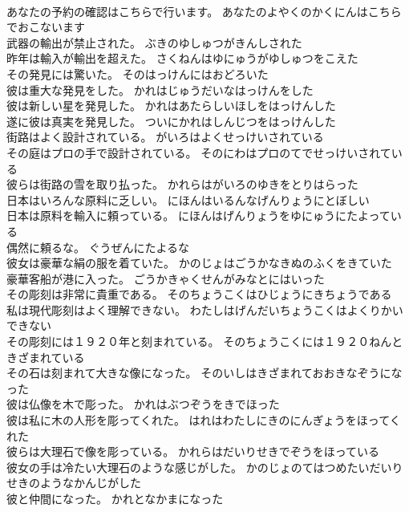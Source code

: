 \documentclass[8pt]{extreport}
\begin{document}
\begin{CJK}{UTF8}{min}
\\	あなたの予約の確認はこちらで行います。	あなたのよやくのかくにんはこちらでおこないます 
\\	武器の輸出が禁止された。	ぶきのゆしゅつがきんしされた 
\\	昨年は輸入が輸出を超えた。	さくねんはゆにゅうがゆしゅつをこえた 
\\	その発見には驚いた。	そのはっけんにはおどろいた 
\\	彼は重大な発見をした。	かれはじゅうだいなはっけんをした 
\\	彼は新しい星を発見した。	かれはあたらしいほしをはっけんした 
\\	遂に彼は真実を発見した。	ついにかれはしんじつをはっけんした 
\\	街路はよく設計されている。	がいろはよくせっけいされている 
\\	その庭はプロの手で設計されている。	そのにわはプロのてでせっけいされている 
\\	彼らは街路の雪を取り払った。	かれらはがいろのゆきをとりはらった 
\\	日本はいろんな原料に乏しい。	にほんはいるんなげんりょうにとぼしい 
\\	日本は原料を輸入に頼っている。	にほんはげんりょうをゆにゅうにたよっている 
\\	偶然に頼るな。	ぐうぜんにたよるな 
\\	彼女は豪華な絹の服を着ていた。	かのじょはごうかなきぬのふくをきていた 
\\	豪華客船が港に入った。	ごうかきゃくせんがみなとにはいった 
\\	その彫刻は非常に貴重である。	そのちょうこくはひじょうにきちょうである 
\\	私は現代彫刻はよく理解できない。	わたしはげんだいちょうこくはよくりかいできない 
\\	その彫刻には１９２０年と刻まれている。	そのちょうこくには１９２０ねんときざまれている 
\\	その石は刻まれて大きな像になった。	そのいしはきざまれておおきなぞうになった 
\\	彼は仏像を木で彫った。	かれはぶつぞうをきでほった 
\\	彼は私に木の人形を彫ってくれた。	はれはわたしにきのにんぎょうをほってくれた 
\\	彼らは大理石で像を彫っている。	かれらはだいりせきでぞうをほっている 
\\	彼女の手は冷たい大理石のような感じがした。	かのじょのてはつめたいだいりせきのようなかんじがした 
\\	彼と仲間になった。	かれとなかまになった 

\end{CJK}
\end{document}
